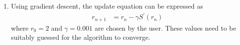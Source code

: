 \begin{enumerate}[label=\thesection.\arabic*.,ref=\thesection.\theenumi]
\begin{figure}[!h]
	\caption{}
	\label{fig:opt-12-3}
\end{figure}
	\item Using gradient descent, the update equation can be expressed as 
		\begin{align}
			r_{n+1} &= r_n - \gamma S^{\prime}(r_n)
		\end{align}
		where $r_0 = 2$ and $\gamma = 0.001$ are chosen by the user.  These values need to be suitably guessed for the algorithm to converge.
\end{enumerate}


